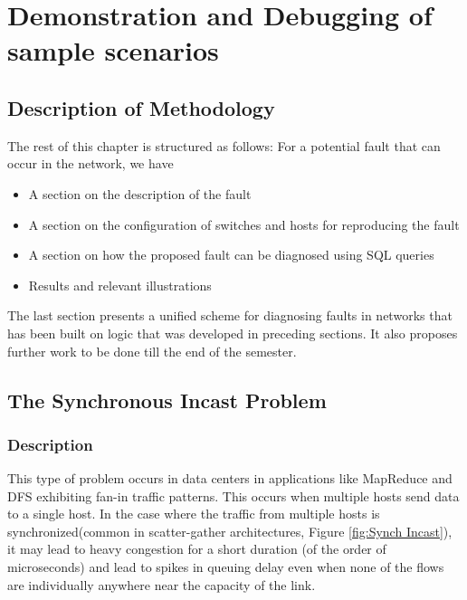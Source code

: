 
\chapter{Demonstration and Debugging of sample scenarios} %

\label{Chapter5} %



\section{Description of Methodology}
The rest of this chapter is structured as follows: For a potential fault that can occur in the network, we have
\begin{itemize}
    \item A section on the description of the fault
    \item A section on the configuration of switches and hosts for reproducing the fault
    \item A section on how the proposed fault can be diagnosed using SQL queries
    \item Results and relevant illustrations
\end{itemize}

The last section presents a unified scheme for diagnosing faults in networks that has been built on logic that was developed
in preceding sections. It also proposes further work to be done till the end of the semester.
\section{The Synchronous Incast Problem}

\subsection{Description}

This type of problem occurs in data centers in applications like MapReduce and DFS exhibiting fan-in traffic patterns.
This occurs when multiple hosts send data to a single host. In the case where the traffic from multiple hosts is
synchronized(common in scatter-gather architectures, Figure \ref{fig:Synch Incast}), it may lead to heavy congestion for a short duration (of the
order of microseconds\cite{microburst}) and lead to spikes in queuing delay even when none of the flows are individually anywhere near
the capacity of the link.

